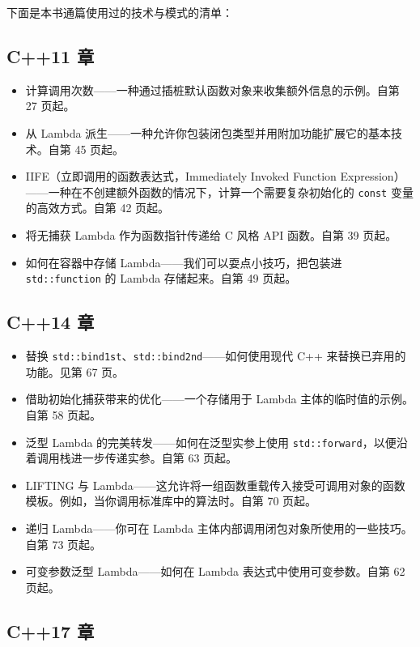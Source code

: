 下面是本书通篇使用过的技术与模式的清单：

\subsection{C++11 章}

\begin{itemize}
\item 计算调用次数——一种通过插桩默认函数对象来收集额外信息的示例。自第 27 页起。
\item 从 Lambda 派生——一种允许你包装闭包类型并用附加功能扩展它的基本技术。自第 45 页起。
\item IIFE（立即调用的函数表达式，Immediately Invoked Function Expression）——一种在不创建额外函数的情况下，计算一个需要复杂初始化的 \texttt{const} 变量的高效方式。自第 42 页起。
\item 将无捕获 Lambda 作为函数指针传递给 C 风格 API 函数。自第 39 页起。
\item 如何在容器中存储 Lambda——我们可以耍点小技巧，把包装进 \texttt{std::function} 的 Lambda 存储起来。自第 49 页起。
\end{itemize}

\subsection{C++14 章}

\begin{itemize}
\item 替换 \texttt{std::bind1st}、\texttt{std::bind2nd}——如何使用现代 C++ 来替换已弃用的功能。见第 67 页。
\item 借助初始化捕获带来的优化——一个存储用于 Lambda 主体的临时值的示例。自第 58 页起。
\item 泛型 Lambda 的完美转发——如何在泛型实参上使用 \texttt{std::forward}，以便沿着调用栈进一步传递实参。自第 63 页起。
\item LIFTING 与 Lambda——这允许将一组函数重载传入接受可调用对象的函数模板。例如，当你调用标准库中的算法时。自第 70 页起。
\item 递归 Lambda——你可在 Lambda 主体内部调用闭包对象所使用的一些技巧。自第 73 页起。
\item 可变参数泛型 Lambda——如何在 Lambda 表达式中使用可变参数。自第 62 页起。
\end{itemize}

\subsection{C++17 章}

